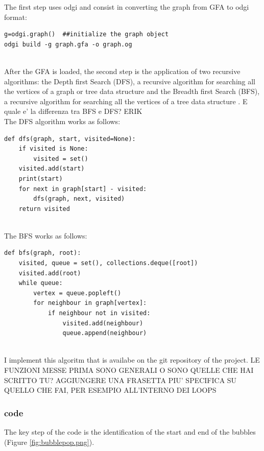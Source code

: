 The first step uses odgi and consist in converting the graph from GFA to odgi format: 
\begin{verbatim}
g=odgi.graph()  ##initialize the graph object
odgi build -g graph.gfa -o graph.og
\end{verbatim}\\

After the GFA is loaded, the second step is the application of two recursive algorithms: the Depth first Search (DFS), a recursive algorithm for searching all the vertices of a graph or tree data structure \cite{GIUSTA CITAZIONE } and the Breadth first Search (BFS), a recursive algorithm for searching all the vertices of a tree data structure \cite{GIUSTACITAZIONE}. E quale e' la differenza tra BFS  e DFS? ERIK \\

\noindent
The DFS algorithm works as follows:
\begin{verbatim}
def dfs(graph, start, visited=None):
    if visited is None:
        visited = set()
    visited.add(start)
    print(start)
    for next in graph[start] - visited:
        dfs(graph, next, visited)
    return visited
\end{verbatim}\\

\noindent
The BFS works as follows:
\begin{verbatim}
def bfs(graph, root): 
    visited, queue = set(), collections.deque([root])
    visited.add(root)
    while queue: 
        vertex = queue.popleft()
        for neighbour in graph[vertex]: 
            if neighbour not in visited: 
                visited.add(neighbour) 
                queue.append(neighbour) 
\end{verbatim}\\

I implement this algoritm that is availabe on the git repository of the project. LE FUNZIONI MESSE PRIMA SONO GENERALI O SONO QUELLE CHE HAI SCRITTO TU? AGGIUNGERE UNA FRASETTA PIU' SPECIFICA SU QUELLO CHE FAI, PER ESEMPIO ALL'INTERNO DEI LOOPS 


\subsubsection{\bbc code}

The key step of the \bbc code is the identification of the start and end of the bubbles (Figure \ref{fig:bubblepop.png}).\\

